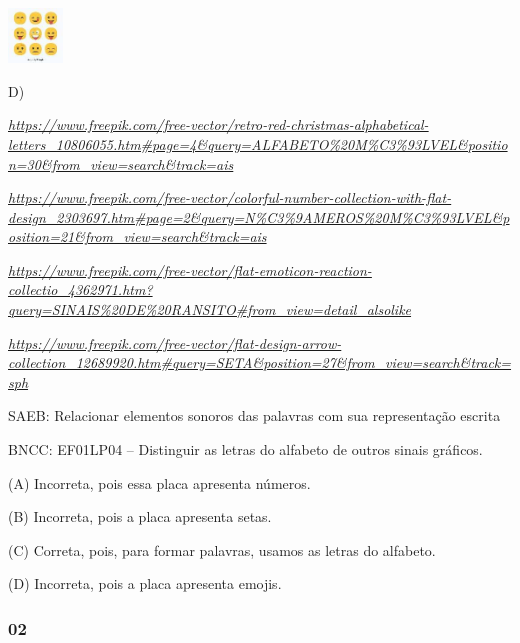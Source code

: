 \includegraphics[width=0.57431in,height=0.57431in]{media/image242.jpg}

D)

\href{https://www.freepik.com/free-vector/retro-red-christmas-alphabetical-letters_10806055.htm\#page=4\&query=ALFABETO\%20M\%C3\%93LVEL\&position=30\&from_view=search\&track=ais}{\emph{https://www.freepik.com/free-vector/retro-red-christmas-alphabetical-letters\_10806055.htm\#page=4\&query=ALFABETO\%20M\%C3\%93LVEL\&position=30\&from\_view=search\&track=ais}}

\href{https://www.freepik.com/free-vector/colorful-number-collection-with-flat-design_2303697.htm\#page=2\&query=N\%C3\%9AMEROS\%20M\%C3\%93LVEL\&position=21\&from_view=search\&track=ais}{\emph{https://www.freepik.com/free-vector/colorful-number-collection-with-flat-design\_2303697.htm\#page=2\&query=N\%C3\%9AMEROS\%20M\%C3\%93LVEL\&position=21\&from\_view=search\&track=ais}}

\href{https://www.freepik.com/free-vector/flat-emoticon-reaction-collectio_4362971.htm?query=SINAIS\%20DE\%20RANSITO\#from_view=detail_alsolike}{\emph{https://www.freepik.com/free-vector/flat-emoticon-reaction-collectio\_4362971.htm?query=SINAIS\%20DE\%20RANSITO\#from\_view=detail\_alsolike}}

\href{https://www.freepik.com/free-vector/flat-design-arrow-collection_12689920.htm\#query=SETA\&position=27\&from_view=search\&track=sph}{\emph{https://www.freepik.com/free-vector/flat-design-arrow-collection\_12689920.htm\#query=SETA\&position=27\&from\_view=search\&track=sph}}

SAEB: Relacionar elementos sonoros das palavras com sua representação escrita

BNCC: EF01LP04 -- Distinguir as letras do alfabeto de outros sinais gráficos.

(A) Incorreta, pois essa placa apresenta números.

(B) Incorreta, pois a placa apresenta setas.

(C) Correta, pois, para formar palavras, usamos as letras do alfabeto.

(D) Incorreta, pois a placa apresenta emojis.\protect\hypertarget{_heading=h.kl8qv6rrx63u}{}{}

\subsubsection{02}\label{section-74}

